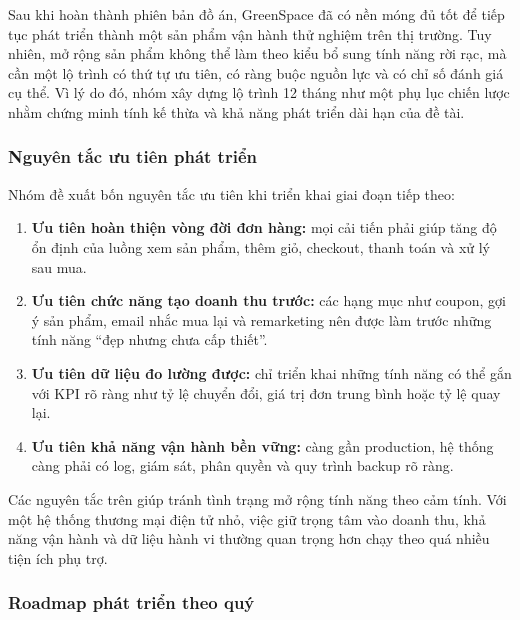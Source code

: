 \documentclass[11pt, a4paper]{article}
\begin{document}
Sau khi hoàn thành phiên bản đồ án, GreenSpace đã có nền móng đủ tốt để tiếp tục phát
triển thành một sản phẩm vận hành thử nghiệm trên thị trường. Tuy nhiên, mở rộng sản phẩm
không thể làm theo kiểu bổ sung tính năng rời rạc, mà cần một lộ trình có thứ tự ưu tiên,
có ràng buộc nguồn lực và có chỉ số đánh giá cụ thể. Vì lý do đó, nhóm xây dựng lộ trình
12 tháng như một phụ lục chiến lược nhằm chứng minh tính kế thừa và khả năng phát triển
dài hạn của đề tài.

\subsubsection{Nguyên tắc ưu tiên phát triển}

Nhóm đề xuất bốn nguyên tắc ưu tiên khi triển khai giai đoạn tiếp theo:

\begin{enumerate}[leftmargin=*]
    \item \textbf{Ưu tiên hoàn thiện vòng đời đơn hàng:} mọi cải tiến phải giúp tăng độ ổn định
          của luồng xem sản phẩm, thêm giỏ, checkout, thanh toán và xử lý sau mua.
    \item \textbf{Ưu tiên chức năng tạo doanh thu trước:} các hạng mục như coupon, gợi ý sản phẩm,
          email nhắc mua lại và remarketing nên được làm trước những tính năng ``đẹp nhưng chưa cấp thiết''.
    \item \textbf{Ưu tiên dữ liệu đo lường được:} chỉ triển khai những tính năng có thể gắn với KPI
          rõ ràng như tỷ lệ chuyển đổi, giá trị đơn trung bình hoặc tỷ lệ quay lại.
    \item \textbf{Ưu tiên khả năng vận hành bền vững:} càng gần production, hệ thống càng phải có log,
          giám sát, phân quyền và quy trình backup rõ ràng.
\end{enumerate}

Các nguyên tắc trên giúp tránh tình trạng mở rộng tính năng theo cảm tính. Với một hệ thống
thương mại điện tử nhỏ, việc giữ trọng tâm vào doanh thu, khả năng vận hành và dữ liệu hành vi
thường quan trọng hơn chạy theo quá nhiều tiện ích phụ trợ.

\subsubsection{Roadmap phát triển theo quý}
\end{document}
